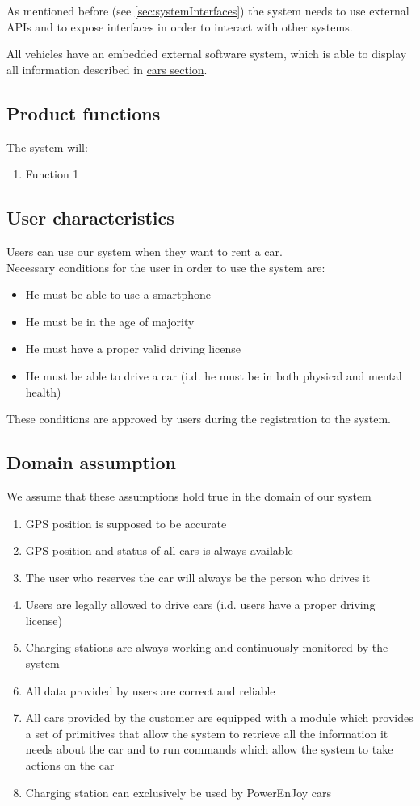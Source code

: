 As mentioned before (see \autoref{sec:systemInterfaces}) the system needs to use external APIs and to expose interfaces in order to interact with other systems.

All vehicles have an embedded external software system, which is able to display all information described in \hyperref[sec:cars]{cars section}.

\subsection{Product functions}
	The system will:
	\begin{enumerate}[label=\textbf{F\arabic*.}]
		\item Function 1
	\end{enumerate}

\subsection{User characteristics}
	Users can use our system when they want to rent a car.\\
	Necessary conditions for the user in order to use the system are:
	\begin{itemize}
		\item He must be able to use a smartphone
		\item He must be in the age of majority
		\item He must have a proper valid driving license
		\item He must be able to drive a car (i.d. he must be in both physical and mental health)
	\end{itemize}
	These conditions are approved by users during the registration to the system.

\subsection{Domain assumption}
	We assume that these assumptions hold true in the domain of our system 
	\begin{enumerate}[label=\textbf{DA\arabic*}]
		\item GPS position is supposed to be accurate
		\item GPS position and status of all cars is always available
		\item The user who reserves the car will always be the person who drives it
		\item Users are legally allowed to drive cars (i.d. users have a proper driving license)
		\item Charging stations are always working and continuously monitored by the system
		\item All data provided by users are correct and reliable
		\item All cars provided by the customer are equipped with a module which provides a set of
		primitives that allow the system to retrieve all the information it needs about
		the car and to run commands which allow the system to take actions on the car
		\item Charging station can exclusively be used by PowerEnJoy cars 
	\end{enumerate}